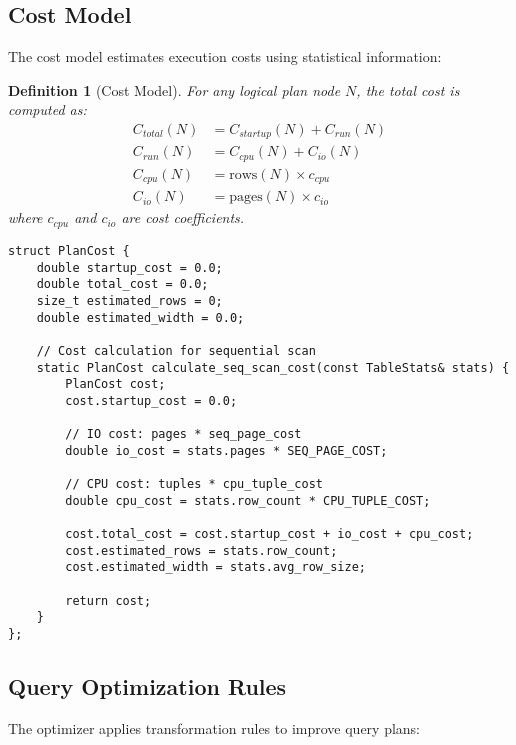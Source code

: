 \documentclass[12pt,a4paper]{article}
\newtheorem{definition}{Definition}[section]
\begin{document}
\subsection{Cost Model}

The cost model estimates execution costs using statistical information:

\begin{definition}[Cost Model]
For any logical plan node $N$, the total cost is computed as:
\begin{align}
C_{total}(N) &= C_{startup}(N) + C_{run}(N) \\
C_{run}(N) &= C_{cpu}(N) + C_{io}(N) \\
C_{cpu}(N) &= \text{rows}(N) \times c_{cpu} \\
C_{io}(N) &= \text{pages}(N) \times c_{io}
\end{align}
where $c_{cpu}$ and $c_{io}$ are cost coefficients.
\end{definition}

\begin{lstlisting}[style=cpp, caption=Cost Calculation Implementation]
struct PlanCost {
    double startup_cost = 0.0;
    double total_cost = 0.0;
    size_t estimated_rows = 0;
    double estimated_width = 0.0;
    
    // Cost calculation for sequential scan
    static PlanCost calculate_seq_scan_cost(const TableStats& stats) {
        PlanCost cost;
        cost.startup_cost = 0.0;
        
        // IO cost: pages * seq_page_cost
        double io_cost = stats.pages * SEQ_PAGE_COST;
        
        // CPU cost: tuples * cpu_tuple_cost
        double cpu_cost = stats.row_count * CPU_TUPLE_COST;
        
        cost.total_cost = cost.startup_cost + io_cost + cpu_cost;
        cost.estimated_rows = stats.row_count;
        cost.estimated_width = stats.avg_row_size;
        
        return cost;
    }
};
\end{lstlisting}

\subsection{Query Optimization Rules}

The optimizer applies transformation rules to improve query plans:
\end{document}
